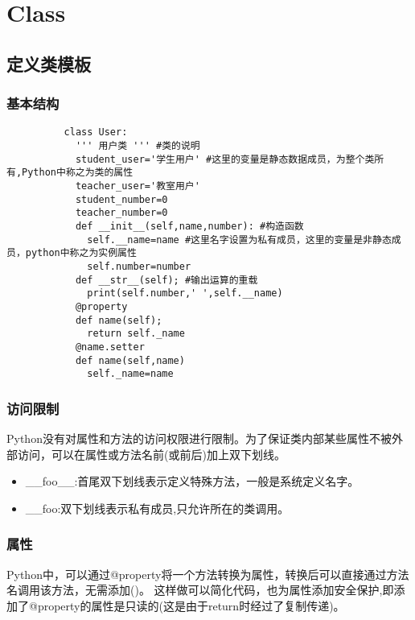 \documentclass{article}
\begin{document}
  \section{Class}

    \subsection{定义类模板}
      \subsubsection{基本结构}
        \begin{lstlisting}
          class User: 
            ''' 用户类 ''' #类的说明
            student_user='学生用户' #这里的变量是静态数据成员，为整个类所有,Python中称之为类的属性
            teacher_user='教室用户'
            student_number=0
            teacher_number=0
            def __init__(self,name,number): #构造函数
              self.__name=name #这里名字设置为私有成员，这里的变量是非静态成员，python中称之为实例属性
              self.number=number
            def __str__(self); #输出运算的重载
              print(self.number,' ',self.__name)
            @property
            def name(self);
              return self._name
            @name.setter
            def name(self,name)
              self._name=name
        \end{lstlisting}

      \subsubsection{访问限制}
        Python没有对属性和方法的访问权限进行限制。为了保证类内部某些属性不被外部访问，可以在属性或方法名前(或前后)加上双下划线。
        \begin{itemize}
          \item \_\_foo\_\_:首尾双下划线表示定义特殊方法，一般是系统定义名字。
          \item \_\_foo:双下划线表示私有成员,只允许所在的类调用。
        \end{itemize}

      \subsubsection{属性}
        Python中，可以通过@property将一个方法转换为属性，转换后可以直接通过方法名调用该方法，无需添加()。
        这样做可以简化代码，也为属性添加安全保护,即添加了@property的属性是只读的(这是由于return时经过了复制传递)。
\end{document}
